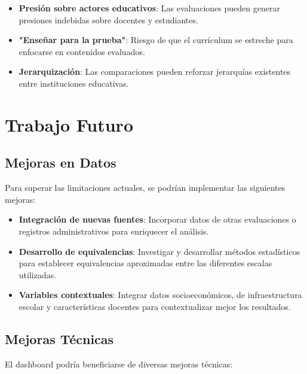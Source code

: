 \begin{itemize}
    \item \textbf{Presión sobre actores educativos}: Las evaluaciones pueden generar presiones indebidas sobre docentes y estudiantes.
    
    \item \textbf{"Enseñar para la prueba"}: Riesgo de que el currículum se estreche para enfocarse en contenidos evaluados.
    
    \item \textbf{Jerarquización}: Las comparaciones pueden reforzar jerarquías existentes entre instituciones educativas.
\end{itemize}

\section{Trabajo Futuro}

\subsection{Mejoras en Datos}
Para superar las limitaciones actuales, se podrían implementar las siguientes mejoras:

\begin{itemize}
    \item \textbf{Integración de nuevas fuentes}: Incorporar datos de otras evaluaciones o registros administrativos para enriquecer el análisis.
    
    \item \textbf{Desarrollo de equivalencias}: Investigar y desarrollar métodos estadísticos para establecer equivalencias aproximadas entre las diferentes escalas utilizadas.
    
    \item \textbf{Variables contextuales}: Integrar datos socioeconómicos, de infraestructura escolar y características docentes para contextualizar mejor los resultados.
\end{itemize}

\subsection{Mejoras Técnicas}
El dashboard podría beneficiarse de diversas mejoras técnicas:

